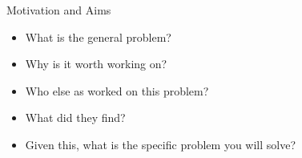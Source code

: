 Motivation and Aims

\begin{itemize}
    \item What is the general problem?
    \item Why is it worth working on?
    \item Who else as worked on this problem?
    \item What did they find?
    \item Given this, what is the specific problem you will solve?
\end{itemize}
